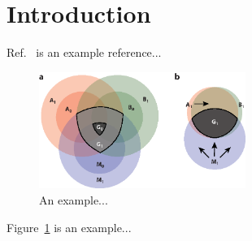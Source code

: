\section{Introduction}
\label{sec:intro}

Ref.~\cite{Abi:2020wmh} is an example reference...

\begin{figure}[htbp]
  \includegraphics[width=0.6\textwidth]{plots/SampleFigure.eps}
  \caption{An example...}
  \label{fig:example}    
\end{figure}
Figure~\ref{fig:example} is an example...

